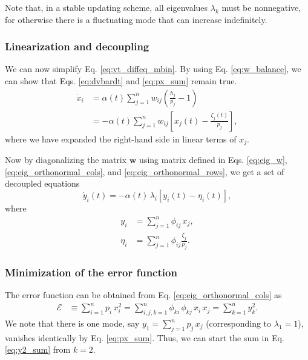 \documentclass[reprint]{revtex4-1}
\begin{document}
Note that, in a stable updating scheme,
all eigenvalues $\lambda_k$ must be nonnegative,
for otherwise there is a fluctuating mode
that can increase indefinitely.



\subsubsection{Linearization and decoupling}



We can now simplify Eq. \eqref{eq:vt_diffeq_mbin}.
%
By using Eq. \eqref{eq:w_balance},
we can show that
Eqs. \eqref{eq:dvbardt} and \eqref{eq:px_sum}
remain true.
%
%
$$
\begin{aligned}
\dot x_i
&= \alpha(t) \sum_{j=1}^n w_{ij}
\left( \frac{ h_j } { p_j }  - 1 \right)
\\
&=
-\alpha(t) \sum_{j = 1}^n
w_{ij} \left[ x_j(t) - \frac{\zeta_j (t)}{p_j} \right],
\end{aligned}
$$
where
we have expanded the right-hand side
in linear terms of $x_j$.


Now by diagonalizing the matrix $\mathbf w$
using matrix defined in Eqs. \eqref{eq:eig_w},
\eqref{eq:eig_orthonormal_cols},
and
\eqref{eq:eig_orthonormal_rows},
we get a set of decoupled equations
%
\begin{equation}
\dot y_i(t)
=
-\alpha(t) \, \lambda_i
[y_i(t) - \eta_i(t)],
\label{eq:yt_diffeq}
\end{equation}
%
where
\begin{align}
  y_i &= \sum_{j=1}^n \phi_{ij} \, x_j,
  \label{eq:y_def}
  \\
  \eta_i &= \sum_{j=1}^n \phi_{ij} \frac{ \zeta_j}{ p_j}.
  \label{eq:eta_def}
\end{align}



\subsubsection{Minimization of the error function}



The error function can be obtained
from Eq. \eqref{eq:eig_orthonormal_cols}
as
\begin{align}
  \mathcal E
  &\equiv
  \sum_{i = 1}^n p_i \, x_i^2
  =
  \sum_{i, j, k=1}^n \phi_{ki} \, \phi_{kj} \, x_i \, x_j
  =
  \sum_{k = 1}^n y_k^2.
  \label{eq:y2_sum}
\end{align}
%
We note that there is one mode, say
$y_1 = \sum_{j=1}^n p_j \, x_j$
(corresponding to $\lambda_1 = 1$),
vanishes identically by Eq. \eqref{eq:px_sum}.
%
Thus, we can start the sum in Eq. \eqref{eq:y2_sum}
from $k = 2$.
\end{document}
